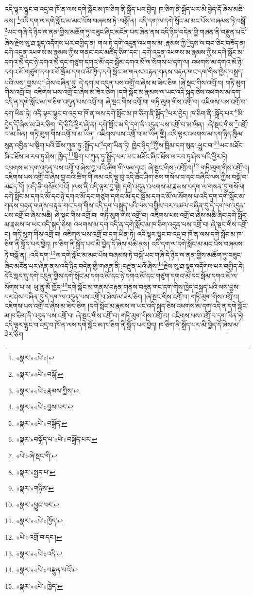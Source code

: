 འདི་ལྟར་ལྟུང་བ་འདྲ་བ་ཁོ་ན་ལས་དགེ་སློང་མ་ཁ་ཅིག་ནི་སྐྲོད་པར་བྱེད། ཁ་ཅིག་ནི་སྐྲོད་པར་མི་བྱེད་དོ་ཞེས་མཆི་ནས། \footnote{«སྣར་»«པེ་»།  }འདི་དག་ལ་དགེ་སློང་མ་མང་པོས་བཞམས་ཏེ་:བསྒོ་ན། འདི་དག་ལ་དགེ་སློང་མ་མང་པོས་བཞམས་ཏེ་བསྒོ་\footnote{«སྣར་»«པེ་»བསྒོ་}ཡང་གཞི་དེ་ཉིད་ལ་ནན་གྱིས་མཆོག་ཏུ་བཟུང་ཞིང་མངོན་པར་ཞེན་ནས་འདི་ཉིད་བདེན་གྱི་གཞན་ནི་བརྫུན་པའོ་ཞེས་རྗེས་སུ་ཐ་སྙད་འདོགས་པར་བགྱིད་ན། གལ་ཏེ་དགེ་འདུན་འཕགས་མ་:རྣམས་ཀྱི་\footnote{«སྣར་»«པེ་»རྣམས་ཀྱིས་}དུས་ལ་བབ་ཅིང་བཟོད་ན། དགེ་འདུན་འཕགས་མ་རྣམས་ཀྱིས་གནང་བར་མཛོད་ཅིག་དང་། དགེ་འདུན་འཕགས་མ་རྣམས་ཀྱིས་དགེ་སློང་མ་དགའ་མོ་དང་ཉེ་དགའ་མོ་དང་གཙུག་དགའ་མོ་དང་སྦོམ་དགའ་མོ་ལ་སོགས་པ་དག་ལ། འཕགས་མ་དགའ་མོ་ཉེ་དགའ་མོ་གཙུག་དགའ་མོ་སྦོམ་དགའ་མོ་ཁྱོད་དགེ་སློང་མ་གནས་བརྟན་གནས་བརྟན་གང་དག་གིས་ཁྱེད་བསྐྲད་པའི་ལས་:བྱས་པ་\footnote{«སྣར་»«པེ་»བྱས་པར་}ཤེས་བཞིན་དུ། དེ་དག་ལ་འདུན་པས་འགྲོ་བ་ཞེས་མ་ཟེར་ཅིག །ཞེ་སྡང་གིས་འགྲོ་བ། གཏི་མུག་གིས་འགྲོ་བ། འཇིགས་པས་འགྲོ་བ་ཞེས་མ་ཟེར་ཅིག །དགེ་སློང་མ་རྣམས་ལ་ཡང་འདི་སྐད་ཅེས་འཕགས་མ་དག་འདི་ན་དགེ་སློང་མ་ཁ་ཅིག་འདུན་པས་འགྲོ་བ། ཞེ་སྡང་གིས་འགྲོ་བ། གཏི་མུག་གིས་འགྲོ་བ། འཇིགས་པས་འགྲོ་བ་དག་ཡིན་ཏེ། འདི་ལྟར་ལྟུང་བ་འདྲ་བ་ཁོ་ན་ལས་དགེ་སློང་མ་ཁ་ཅིག་ནི་སྐྲོད་\footnote{«སྣར་»«པེ་»བསྐྲོད་}པར་བྱེད། ཁ་ཅིག་ནི་:སྐྲོད་པར་\footnote{«སྣར་»བསྐྲོད་པ་«པེ་»བསྐྲོད་པར་}མི་བྱེད་དོ་ཞེས་མ་ཟེར་ཅིག །དེ་ཅིའི་ཕྱིར་ཞེ་ན། དགེ་སློང་མ་དེ་དག་ནི་འདུན་པས་འགྲོ་བ་མ་ཡིན། :ཞེ་སྡང་གིས་\footnote{«པེ་»ཞེ་སྡང་གི་}འགྲོ་བ་མ་ཡིན། གཏི་མུག་གིས་འགྲོ་བ་མ་ཡིན། འཇིགས་པས་འགྲོ་བ་མ་ཡིན་གྱི། འདི་ལྟར་འཕགས་མ་དག་ཉིད་ཁྱིམ་སུན་འབྱིན་པ་སྡིག་པའི་ཆོས་ཀུན་ཏུ་:སྤྱོད་པ་\footnote{«སྣར་»སྤྱད་པ་}དག་ཡིན་ཏེ། ཁྱེད་ཉིད་\footnote{«སྣར་»གཉིས་}ཀྱིས་ཁྱིམ་དག་སུན་:ཕྱུང་བ་\footnote{«སྣར་»ཕྱུང་བར་}ཡང་མཐོང་ཞིང་ཐོས་ལ་རབ་ཏུ་ཤེས། ཁྱེད་\footnote{«སྣར་»«པེ་»ཁྱོད་}སྡིག་པ་ཀུན་ཏུ་སྤྱོད་པར་ཡང་མཐོང་ཞིང་ཐོས་ལ་རབ་ཏུ་ཤེས་པའི་ཕྱིར་ཏེ། འཕགས་མ་དག་འདུན་པས་འགྲོ་བ་ཞེས་བྱ་བའི་ཚིག་གི་ལམ་དང་། ཞེ་སྡང་གིས་:འགྲོ་བ།\footnote{«པེ་»འགྲོ་བ་དང་།} གཏི་མུག་གིས་འགྲོ་བ། འཇིགས་པས་འགྲོ་བ་ཞེས་བྱ་བའི་ཚིག་གི་ལམ་འདི་ལྟ་བུ་འདི་ཐོང་ཤིག་ཅེས་གསོལ་བ་དང་བཞིའི་ལས་ཀྱིས་བསྒོ་བ་མཛད་དོ། །འདི་ནི་གསོལ་བའོ། །ལས་ནི་འདི་ལྟར་བྱ་སྟེ། དགེ་འདུན་འཕགས་མ་རྣམས་བདག་ལ་གསན་དུ་གསོལ། དགེ་སློང་མ་དགའ་མོ་དང་ཉེ་དགའ་མོ་དང་གཙུག་དགའ་མོ་དང་སྦོམ་དགའ་མོ་ལ་སོགས་པ་འདི་དག་དགེ་སློང་མ་གནས་བརྟན་གནས་བརྟན་གང་དག་གིས་འདི་དག་བསྐྲད་པའི་ལས་བགྱིས་བར་འཚལ་བཞིན་དུ་དེ་དག་ལ་འདུན་པས་འགྲོ་བ་ཞེས་མཆི། ཞེ་སྡང་གིས་འགྲོ་བ། གཏི་མུག་གིས་འགྲོ་བ། འཇིགས་པས་འགྲོ་བ་ཞེས་མཆི་ཞིང་དགེ་སློང་མ་རྣམས་ལ་ཡང་འདི་སྐད་ཅེས། འཕགས་མ་དག་འདི་ན་དགེ་སློང་མ་ཁ་ཅིག་འདུན་པས་འགྲོ་བ། ཞེ་སྡང་གིས་འགྲོ་བ། གཏི་མུག་གིས་འགྲོ་བ། འཇིགས་པས་འགྲོ་བ་དག་ཡིན་ཏེ། འདི་ལྟར་ལྟུང་བ་འདྲ་བ་ཁོ་ན་ལས་དགེ་སློང་མ་ཁ་ཅིག་ནི་སྐྲོད་པར་བྱེད། ཁ་ཅིག་ནི་སྐྲོད་པར་མི་བྱེད་དོ་ཞེས་མཆི་ནས། འདི་དག་ལ་དགེ་སློང་མ་མང་པོས་བཞམས་ཏེ་བསྒོ་ན། :འདི་དག་\footnote{«སྣར་»«པེ་»འདི་}ལ་དགེ་སློང་མ་མང་པོས་བཞམས་ཏེ་བསྒོ་ཡང་གཞི་དེ་ཉིད་ལ་ནན་གྱིས་མཆོག་ཏུ་བཟུང་ཞིང་མངོན་པར་ཞེན་ནས་འདི་ཉིད་བདེན་གྱི་གཞན་ནི་:བརྫུན་པའོ་ཞེས་\footnote{«སྣར་»«པེ་»བརྫུན་པའོ་}རྗེས་སུ་ཐ་སྙད་འདོགས་པར་བགྱིད་དེ། དེའི་སླད་དུ་དགེ་འདུན་གྱིས་དགེ་སློང་མ་དགའ་མོ་དང་ཉེ་དགའ་མོ་དང་གཙུག་དགའ་མོ་དང་སྦོམ་དགའ་མོ་ལ་སོགས་པ་ལ། ཕུ་ནུ་མོ་ཁྱོད་\footnote{«སྣར་»«པེ་»ཁྱེད་}དགེ་སློང་མ་གནས་བརྟན་གནས་བརྟན་གང་དག་གིས་ཁྱེད་བསྐྲད་པའི་ལས་བྱས་པར་ཤེས་བཞིན་དུ་དེ་དག་ལ་འདུན་པས་འགྲོ་བ་ཞེས་མ་ཟེར་ཅིག །ཞེ་སྡང་གིས་འགྲོ་བ། གཏི་མུག་གིས་འགྲོ་བ། འཇིགས་པས་འགྲོ་བ་ཞེས་མ་ཟེར་ཅིག །དགེ་སློང་མ་རྣམས་ལ་ཡང་འདི་སྐད་ཅེས་འཕགས་མ་དག་འདི་ན་དགེ་སློང་མ་ཁ་ཅིག་ནི་འདུན་པས་འགྲོ་བ། ཞེ་སྡང་གིས་འགྲོ་བ། གཏི་མུག་གིས་འགྲོ་བ། འཇིགས་པས་འགྲོ་བ་དག་ཡིན་ཏེ། འདི་ལྟར་ལྟུང་བ་འདྲ་བ་ཁོ་ན་ལས་དགེ་སློང་མ་ཁ་ཅིག་ནི་སྐྲོད་པར་བྱེད། ཁ་ཅིག་ནི་སྐྲོད་པར་མི་བྱེད་དོ་ཞེས་མ་ཟེར་ཅིག 